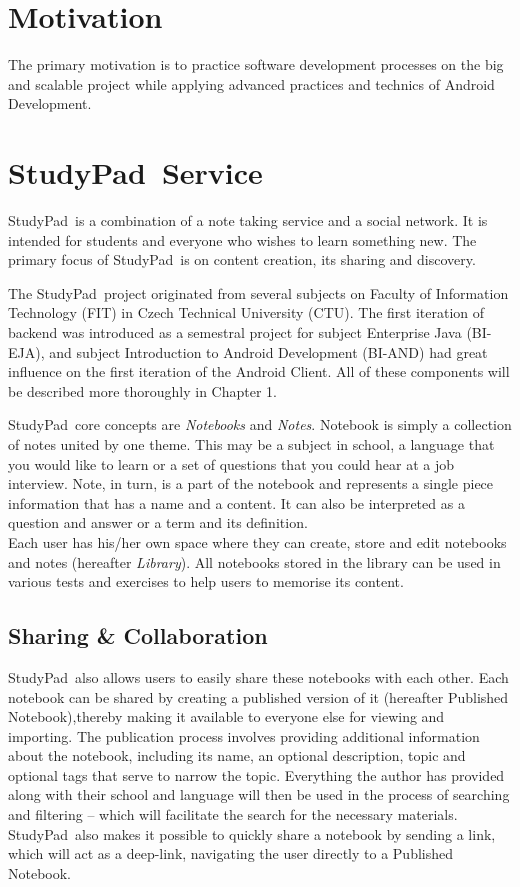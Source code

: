 \documentclass[thesis=B,english]{FITthesis}[2012/10/20]
\newcommand{\appname}{StudyPad}
\begin{document}
\section{Motivation}
The primary motivation is to practice software
development processes on the big and scalable project while applying advanced practices and technics of Android Development.

\section{\appname\ Service}
\appname\ is a combination of a note taking service and a social network. It is intended for students and everyone who wishes to learn something new. The primary focus of \appname\ is on content creation, its sharing and discovery. 

The \appname\ project originated from several subjects on Faculty of Information Technology (FIT) in Czech Technical University (CTU). The first iteration of backend was introduced as a semestral project for subject Enterprise Java (BI-EJA), and subject Introduction to Android Development (BI-AND) had great influence on the first iteration of the Android Client. All of these components will be described more thoroughly in Chapter 1.
 

\appname\ core concepts are \textit{Notebooks} and \textit{Notes}. Notebook is simply a collection of notes united by one theme. This may be a subject in school, a language that you would like to learn or a set of questions that you could hear at a job interview. Note, in turn, is a part of the notebook and represents a single piece information that has a name and a content. It can also be interpreted as a question and answer or a term and its definition.
\\

Each user has his/her own space where they can create, store and edit notebooks and notes (hereafter \textit{Library}). All notebooks stored in the library can be used in various tests and exercises to help users to memorise its content.
\subsection{Sharing \& Collaboration}
\appname\ also allows users to easily share these notebooks with each other. Each notebook can be shared by creating a published version of it (hereafter Published Notebook),thereby making it available to everyone else for viewing and importing.
The publication process involves providing additional information about the notebook, including its name, an optional description, topic and optional tags that serve to narrow the topic. Everything the author has provided along with their school and language will then be used in the process of searching and filtering -- which will facilitate the search for the necessary materials. \appname\ also makes it possible to quickly share a notebook by sending a link, which will act as a deep-link, navigating the user directly to a Published Notebook.
\end{document}
